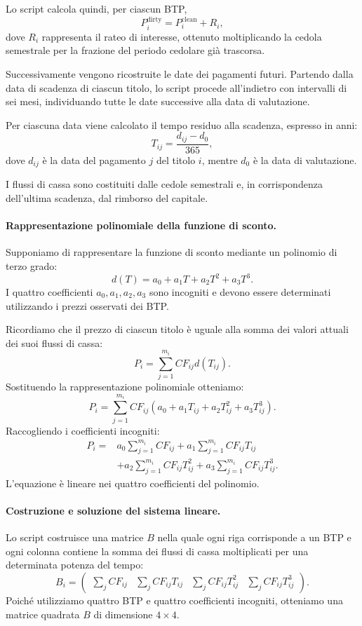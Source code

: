 Lo script calcola quindi, per ciascun BTP,
\[
P_i^{\mathrm{dirty}}=P_i^{\mathrm{clean}}+R_i,
\]
dove $R_i$ rappresenta il rateo di interesse, ottenuto moltiplicando la cedola semestrale per la frazione del periodo cedolare già trascorsa.

Successivamente vengono ricostruite le date dei pagamenti futuri. Partendo dalla data di scadenza di ciascun titolo, lo script procede all'indietro con intervalli di sei mesi, individuando tutte le date successive alla data di valutazione.

Per ciascuna data viene calcolato il tempo residuo alla scadenza, espresso in anni:
\[
T_{ij}=\frac{d_{ij}-d_0}{365},
\]
dove $d_{ij}$ è la data del pagamento $j$ del titolo $i$, mentre $d_0$ è la data di valutazione.

I flussi di cassa sono costituiti dalle cedole semestrali e, in corrispondenza dell'ultima scadenza, dal rimborso del capitale.

\paragraph{Rappresentazione polinomiale della funzione di sconto.}
Supponiamo di rappresentare la funzione di sconto mediante un polinomio di terzo grado:
\[
d(T)=a_0+a_1T+a_2T^2+a_3T^3.
\]
I quattro coefficienti $a_0,a_1,a_2,a_3$ sono incogniti e devono essere determinati utilizzando i prezzi osservati dei BTP.

Ricordiamo che il prezzo di ciascun titolo è uguale alla somma dei valori attuali dei suoi flussi di cassa:
\[
P_i=\sum_{j=1}^{m_i}CF_{ij}d(T_{ij}).
\]
Sostituendo la rappresentazione polinomiale otteniamo:
\[
P_i=\sum_{j=1}^{m_i}CF_{ij}
\left(a_0+a_1T_{ij}+a_2T_{ij}^2+a_3T_{ij}^3\right).
\]
Raccogliendo i coefficienti incogniti:
\begin{align*}
P_i={}&a_0\sum_{j=1}^{m_i}CF_{ij}
+a_1\sum_{j=1}^{m_i}CF_{ij}T_{ij}\\
&+a_2\sum_{j=1}^{m_i}CF_{ij}T_{ij}^2
+a_3\sum_{j=1}^{m_i}CF_{ij}T_{ij}^3.
\end{align*}
L'equazione è lineare nei quattro coefficienti del polinomio.

\paragraph{Costruzione e soluzione del sistema lineare.}
Lo script costruisce una matrice $B$ nella quale ogni riga corrisponde a un BTP e ogni colonna contiene la somma dei flussi di cassa moltiplicati per una determinata potenza del tempo:
\[
B_i=\begin{pmatrix}
\displaystyle\sum_j CF_{ij} &
\displaystyle\sum_j CF_{ij}T_{ij} &
\displaystyle\sum_j CF_{ij}T_{ij}^2 &
\displaystyle\sum_j CF_{ij}T_{ij}^3
\end{pmatrix}.
\]
Poiché utilizziamo quattro BTP e quattro coefficienti incogniti, otteniamo una matrice quadrata $B$ di dimensione $4\times4$.

